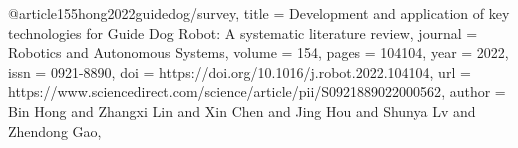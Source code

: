 @article{155hong2022guidedog/survey,
title = {Development and application of key technologies for Guide Dog Robot: A systematic literature review},
journal = {Robotics and Autonomous Systems},
volume = {154},
pages = {104104},
year = {2022},
issn = {0921-8890},
doi = {https://doi.org/10.1016/j.robot.2022.104104},
url = {https://www.sciencedirect.com/science/article/pii/S0921889022000562},
author = {Bin Hong and Zhangxi Lin and Xin Chen and Jing Hou and Shunya Lv and Zhendong Gao},
}